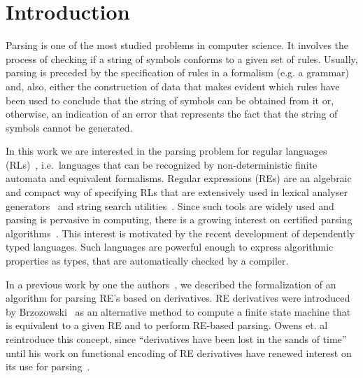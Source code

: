 \documentclass[sigplan, anonymous, review]{acmart}
\theoremstyle{definition}
\begin{document}



\maketitle


\section{Introduction}\label{sec:intro}

Parsing is one of the most studied problems in computer science. 
It involves the process of checking if a string of symbols conforms to
a given set of rules. Usually, parsing is preceded by the 
specification of rules in a formalism (e.g. a grammar) and, also, either the
construction of data that makes evident which rules have been used to
conclude that the string of symbols can be obtained from it or, otherwise,
an indication of an error that represents the
fact that the string of symbols cannot be generated.

In this work we are interested in the parsing problem for regular
languages (RLs)~\cite{Hopcroft2000}, i.e.~languages that can be
recognized by non-deterministic finite automata and equivalent
formalisms. Regular expressions (REs) are an algebraic and compact way
of specifying RLs that are extensively used in lexical analyser
generators~\cite{Lesk1990} and string search utilities~\cite{Grep}.
Since such tools are widely used and parsing is pervasive in
computing, there is a growing interest on certified parsing
algorithms~\cite{FirsovU13,FirsovU14,Danielsson2010}.  
This interest is motivated by the recent development of dependently typed
languages. Such languages are powerful enough to express algorithmic
properties as types, that are automatically checked by a compiler.

In a previous work by one the authors~\cite{Lopes2016}, we described
the formalization of an algorithm for parsing RE's based on 
derivatives. RE derivatives were introduced by
Brzozowski~\cite{Brzozowski1964} as an alternative method to compute a
finite state machine that is equivalent to a given RE and to perform
RE-based parsing. Owens et. al~\cite{Owens2009} reintroduce this concept,
since ``derivatives have been lost in the sands of time'' until his work on
functional encoding of RE derivatives have renewed interest on its use
for parsing~\cite{Might2011,Fischer2010}. 
\end{document}
